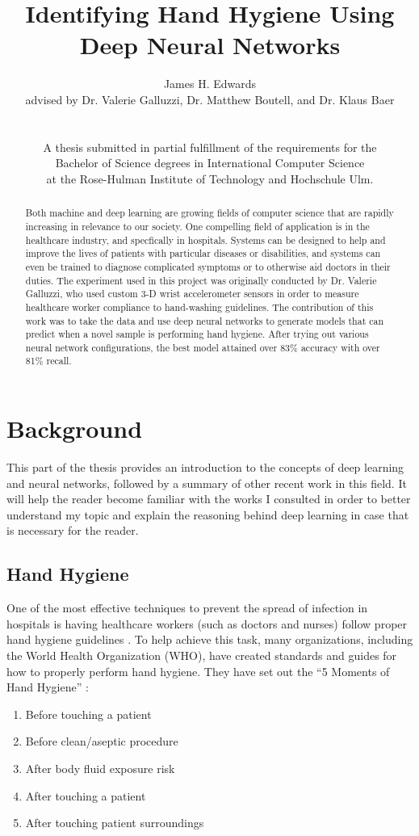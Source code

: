 \documentclass[]{report}
\title{Identifying Hand Hygiene Using Deep Neural Networks}
\author{James H. Edwards \\ 
	advised by Dr. Valerie Galluzzi, Dr. Matthew Boutell, and Dr. Klaus Baer\\
	\\
	\\
	A thesis submitted in partial fulfillment of the requirements for the \\
	Bachelor of Science degrees in International Computer Science \\
	at the Rose-Hulman Institute of Technology and Hochschule Ulm.}
\begin{document}
\maketitle
\tableofcontents

\begin{abstract}
	Both machine and deep learning are growing fields of computer science that are rapidly increasing in relevance to our society. One compelling field of application is in the healthcare industry, and specfically in hospitals. Systems can be designed to help and improve the lives of patients with particular diseases or disabilities, and systems can even be trained to diagnose complicated symptoms or to otherwise aid doctors in their duties. The experiment used in this project was originally conducted by Dr. Valerie Galluzzi, who used custom 3-D wrist accelerometer sensors in order to measure healthcare worker compliance to hand-washing guidelines. The contribution of this work was to take the data and use deep neural networks to generate models that can predict when a novel sample is performing hand hygiene. After trying out various neural network configurations, the best model attained over 83\% accuracy with over 81\% recall.
\end{abstract}

\chapter{Background}

This part of the thesis provides an introduction to the concepts of deep learning and neural networks, followed by a summary of other recent work in this field. It will help the reader become familiar with the works I consulted in order to better understand my topic and explain the reasoning behind deep learning in case that is necessary for the reader.


\section{Hand Hygiene}

One of the most effective techniques to prevent the spread of infection in hospitals is having healthcare workers (such as doctors and nurses) follow proper hand hygiene guidelines \cite{Galluzzi}. To help achieve this task, many organizations, including the World Health Organization (WHO), have created standards and guides for how to properly perform hand hygiene. They have set out the ``5 Moments of Hand Hygiene'' \cite{WHO}:
\begin{enumerate}
	\item Before touching a patient
	\item Before clean/aseptic procedure
	\item After body fluid exposure risk
	\item After touching a patient
	\item After touching patient surroundings
\end{enumerate}
\end{document}

